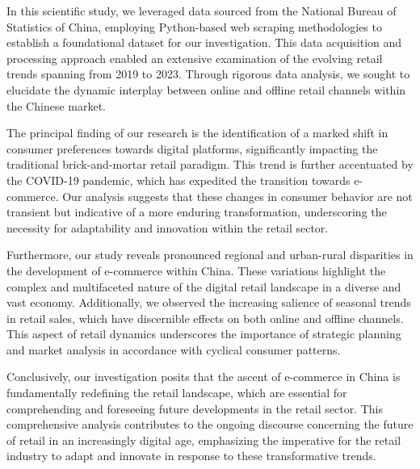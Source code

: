 \documentclass{article}
\begin{document}
In this scientific study, we leveraged data sourced from the National Bureau of Statistics of China, employing Python-based web scraping methodologies to establish a foundational dataset for our investigation. This data acquisition and processing approach enabled an extensive examination of the evolving retail trends spanning from 2019 to 2023. Through rigorous data analysis, we sought to elucidate the dynamic interplay between online and offline retail channels within the Chinese market.

The principal finding of our research is the identification of a marked shift in consumer preferences towards digital platforms, significantly impacting the traditional brick-and-mortar retail paradigm. This trend is further accentuated by the COVID-19 pandemic, which has expedited the transition towards e-commerce. Our analysis suggests that these changes in consumer behavior are not transient but indicative of a more enduring transformation, underscoring the necessity for adaptability and innovation within the retail sector.

Furthermore, our study reveals pronounced regional and urban-rural disparities in the development of e-commerce within China. These variations highlight the complex and multifaceted nature of the digital retail landscape in a diverse and vast economy. Additionally, we observed the increasing salience of seasonal trends in retail sales, which have discernible effects on both online and offline channels. This aspect of retail dynamics underscores the importance of strategic planning and market analysis in accordance with cyclical consumer patterns.

Conclusively, our investigation posits that the ascent of e-commerce in China is fundamentally redefining the retail landscape, which are essential for comprehending and foreseeing future developments in the retail sector. This comprehensive analysis contributes to the ongoing discourse concerning the future of retail in an increasingly digital age, emphasizing the imperative for the retail industry to adapt and innovate in response to these transformative trends.
\newpage


\end{document}
